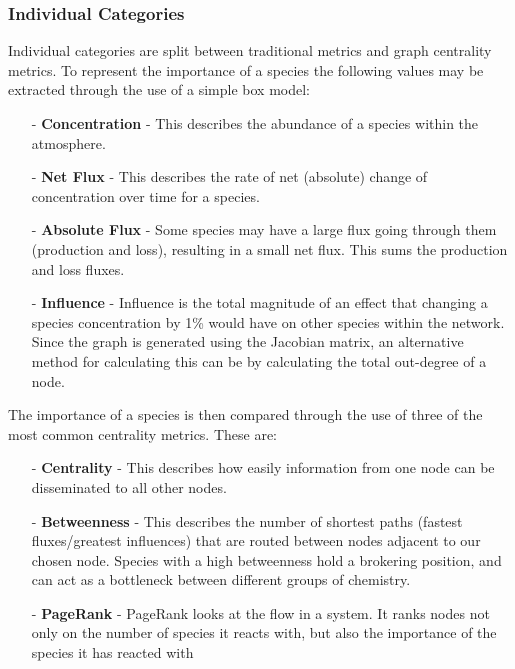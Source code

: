 \subsubsection{Individual Categories}
Individual categories are split between traditional metrics and graph centrality metrics. To represent the importance of a species the following values may be extracted through the use of a simple box model:

\begin{itemize}
\item[-] \textbf{Concentration} - This describes the abundance of a species within the atmosphere. 
\item[-] \textbf{Net Flux} - This describes the rate of net (absolute) change of concentration over time for a species. 
\item[-] \textbf{Absolute Flux} - Some species may have a large flux going through them (production and loss), resulting in a small net flux. This sums the production and loss fluxes. 
\item[-] \textbf{Influence} - Influence is the total magnitude of an effect that changing a species concentration by 1\% would have on other species within the network. Since the graph is generated using the Jacobian matrix, an alternative method for calculating this can be by calculating the total out-degree of a node.  
\end{itemize}



The importance of a species is then compared through the use of three of the most common centrality metrics. These are:


\begin{itemize}
\item[-] \textbf{Centrality} - This describes how easily information from one node can be disseminated to all other nodes. 
\item[-] \textbf{Betweenness} - This describes the number of shortest paths (fastest fluxes/greatest influences) that are routed between nodes adjacent to our chosen node. Species with a high betweenness hold a brokering position, and can act as a bottleneck between different groups of chemistry. 
\item[-] \textbf{PageRank} - PageRank looks at the flow in a system. It ranks nodes not only on the number of species it reacts with, but also the importance of the species it has reacted with

\end{itemize}

